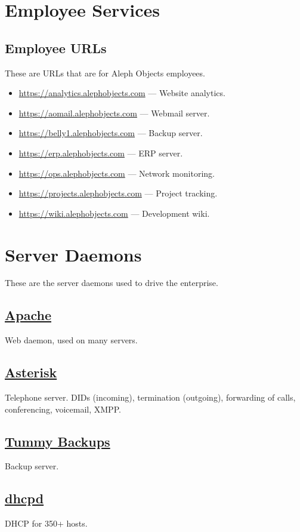 \section{Employee Services}
\subsection{Employee URLs}
These are URLs that are for Aleph Objects employees.

\begin{itemize}
\item \url{https://analytics.alephobjects.com} --- Website analytics.
\item \url{https://aomail.alephobjects.com} --- Webmail server.
\item \url{https://belly1.alephobjects.com} --- Backup server.
\item \url{https://erp.alephobjects.com} --- ERP server.
\item \url{https://ops.alephobjects.com} --- Network monitoring.
\item \url{https://projects.alephobjects.com} --- Project tracking.
\item \url{https://wiki.alephobjects.com} --- Development wiki.
\end{itemize}

\section{Server Daemons}
These are the server daemons used to drive the enterprise.

\subsection{\href{http://httpd.apache.org/}{Apache}}
Web daemon, used on many servers.

\subsection{\href{http://www.asterisk.org}{Asterisk}}
Telephone server. DIDs (incoming), termination (outgoing), forwarding of calls, conferencing,
voicemail, XMPP.

\subsection{\href{https://github.com/tummy-dot-com/tummy-backup}{Tummy Backups}}
Backup server.

\subsection{\href{http://dnsmasq.org/}{dhcpd}}
DHCP for 350+ hosts.

